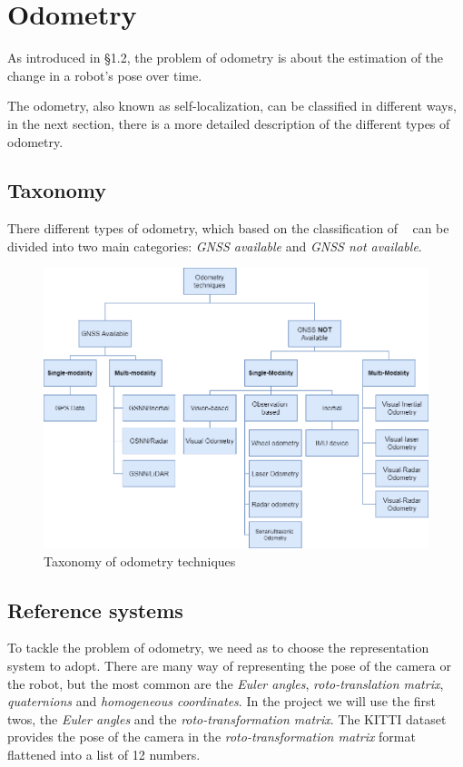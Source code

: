 \section{Odometry}\label{sec:visual-odometry}
As introduced in \S1.2, the problem of odometry is about the estimation of the change in a robot's pose over time.

The odometry, also known as self-localization, can be classified in different ways, in the next section, there is a more detailed description of the different types of odometry.

\subsection{Taxonomy}\label{subsec:tassonomy}
There different types of odometry, which based on the classification of ~\cite{vo_state_of_art} can be divided into two main categories: \textit{GNSS available} and \textit{GNSS not available}.
\begin{figure}[H]
    \centering
    \includegraphics[width=\textwidth]{images/2_2_taxonomy_odometry}
    \caption{Taxonomy of odometry techniques}\label{fig:odometry-taxonomy}
\end{figure}

\subsection{Reference systems}\label{subsec:reference-systems}
To tackle the problem of odometry, we need as to choose the representation system to adopt.
There are many way of representing the pose of the camera or the robot, but the most common are the \textit{Euler angles}, \textit{roto-translation matrix}, \textit{quaternions} and \textit{homogeneous coordinates}.
In the project we will use the first twos, the \textit{Euler angles} and the \textit{roto-transformation matrix}.
The KITTI dataset provides the pose of the camera in the \textit{roto-transformation matrix} format flattened into a list of 12 numbers.

